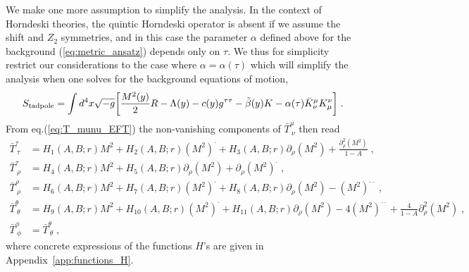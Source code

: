 \documentclass[a4paper,11pt]{article}
\numberwithin{equation}{section}
\begin{document}
We make one more assumption to simplify the analysis. In the context of Horndeski theories, the quintic Horndeski operator is absent if we assume the shift and $Z_2$ symmetries, and in this case the parameter $\alpha$ defined above for the background (\ref{eq:metric_ansatz}) depends only on $\tau$. We thus for simplicity restrict our considerations to the case where $\alpha = \alpha(\tau)$ which will simplify the analysis when one solves for the background equations of motion, 
\begin{align}\label{eq:S_tadpole_simple}
S_{\rm tadpole} = \int d^4x \sqrt{-g} \bigg[\frac{M^2(y)}{2}R - \Lambda(y) - c(y)g^{\tau\tau} - \tilde{\beta}(y)K - \alpha(\tau)\bar{K}^{\mu}_\nu K^\nu_{\mu}  \bigg] \;.
\end{align}
From eq.(\ref{eq:T_munu_EFT}) the non-vanishing components of $\bar{T}^\mu_{\ \nu}$ then read
\begin{align}
\bar{T}^\tau_{\ \tau} &= H_1(A,B;r) M^2 + H_2(A,B;r) (M^2)^\cdot + H_3(A,B;r) \partial_\rho(M^2) + \frac{\partial_\rho^2(M^2)}{1 - A} \;, \label{eq:T_tautau} \\
\bar{T}^\tau_{\ \rho} &= H_4(A,B;r) M^2 + H_5(A,B;r) \partial_\rho(M^2) + \partial_\rho(M^2)^{\cdot} \;, \label{eq:T_tau_rho} \\
\bar{T}^\rho_{\ \rho} &= H_6(A,B;r) M^2 + H_7(A,B;r)(M^2)^\cdot + H_8(A,B;r)\partial_\rho(M^2) - (M^2)^{\cdot\cdot}\;, \label{eq:T_rhorho} \\ 
\bar{T}^\theta_{\ \theta} &=   H_9(A,B;r) M^2 + H_{10}(A,B;r) (M^2)^\cdot + H_{11}(A,B;r) \partial_\rho(M^2) - 4 (M^2)^{\cdot\cdot} + \frac{4}{1 - A} \partial_\rho^2(M^2)\;, \label{eq:T_angular} \\
\bar{T}^\phi_{\ \phi} &= \bar{T}^\theta_{\ \theta}\;,\nonumber
\end{align}
where concrete expressions of the functions $H$'s are given in Appendix~\ref{app:functions_H}. 
\end{document}
